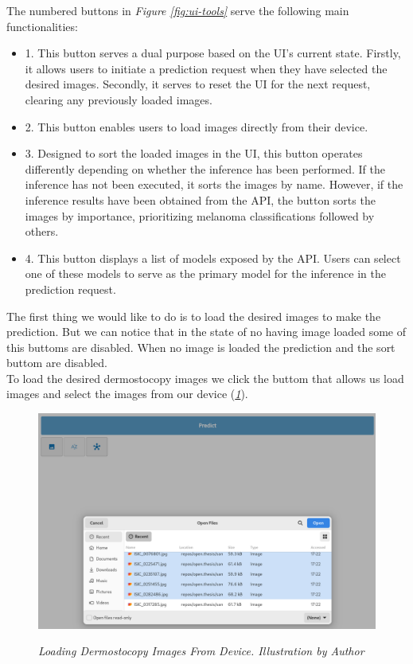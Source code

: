 The numbered buttons in \textit{Figure \ref{fig:ui-tools}} serve the following
main functionalities:

\begin{itemize}
  \item 1. This button serves a dual purpose based on the UI's current state. Firstly, it allows users to initiate a prediction request when they have selected the desired images. Secondly, it serves to reset the UI for the next request, clearing any previously loaded images.
  \item 2. This button enables users to load images directly from their device.
  \item 3. Designed to sort the loaded images in the UI, this button operates differently depending on whether the inference has been performed. If the inference has not been executed, it sorts the images by name. However, if the inference results have been obtained from the API, the button sorts the images by importance, prioritizing melanoma classifications followed by others.
  \item 4. This button displays a list of models exposed by the API. Users can select one of these models to serve as the primary model for the inference in the prediction request.
\end{itemize}


The first thing we would like to do is to load the desired images to make the
prediction. But we can notice that in the state of no having image loaded some
of this buttoms are disabled. When no image is loaded the prediction and the
sort buttom are disabled. \\

To load the desired dermostocopy images we click the buttom that allows us load
images and select the images from our device
(\textit{\ref{fig:selecting-imgs}}).

\begin{figure}[H]
  \centering
  \includegraphics[width=\textwidth]{imatges/results/selecting-images.png}
  \caption[Loading Dermostocopy Images From Device]{\textit{Loading Dermostocopy Images From Device. Illustration by Author}}
  {\label{fig:selecting-imgs}}
\end{figure}

